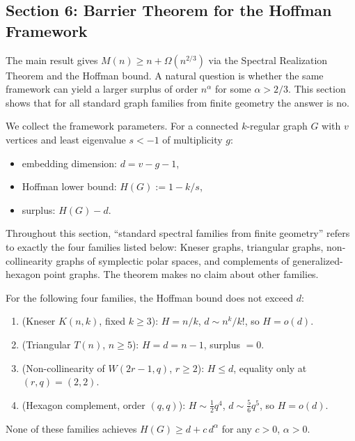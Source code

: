 \subsection*{Section 6: Barrier Theorem for the Hoffman Framework}

The main result gives $M(n)\ge n+\Omega(n^{2/3})$ via the Spectral Realization Theorem and the Hoffman bound.  A natural question is whether the same framework can yield a larger surplus of order $n^\alpha$ for some $\alpha>2/3$.  This section shows that for all standard graph families from finite geometry the answer is no.

\medskip
We collect the framework parameters.  For a connected $k$-regular graph $G$ with $v$ vertices and least eigenvalue $s<-1$ of multiplicity $g$:
\begin{itemize}
  \item embedding dimension: $d = v - g - 1$,
  \item Hoffman lower bound: $H(G) := 1 - k/s$,
  \item surplus: $H(G) - d$.
\end{itemize}

\begin{remark}
Throughout this section, ``standard spectral families from finite geometry'' refers to exactly the four families listed below: Kneser graphs, triangular graphs, non-collinearity graphs of symplectic polar spaces, and complements of generalized-hexagon point graphs.  The theorem makes no claim about other families.
\end{remark}

\begin{theorem}\label{thm:barrier}
For the following four families, the Hoffman bound does not exceed $d$:
\begin{enumerate}
  \item \textup{(Kneser $K(n,k)$, fixed $k\ge 3$):} $H = n/k$, $d\sim n^k/k!$, so $H = o(d)$.
  \item \textup{(Triangular $T(n)$, $n\ge 5$):} $H = d = n-1$, surplus $= 0$.
  \item \textup{(Non-collinearity of $W(2r{-}1,q)$, $r\ge 2$):} $H\le d$, equality only at $(r,q)=(2,2)$.
  \item \textup{(Hexagon complement, order $(q,q)$):} $H\sim\tfrac12q^4$, $d\sim\tfrac56q^5$, so $H = o(d)$.
\end{enumerate}
None of these families achieves $H(G)\ge d+c\,d^\alpha$ for any $c>0$, $\alpha>0$.
\end{theorem}

